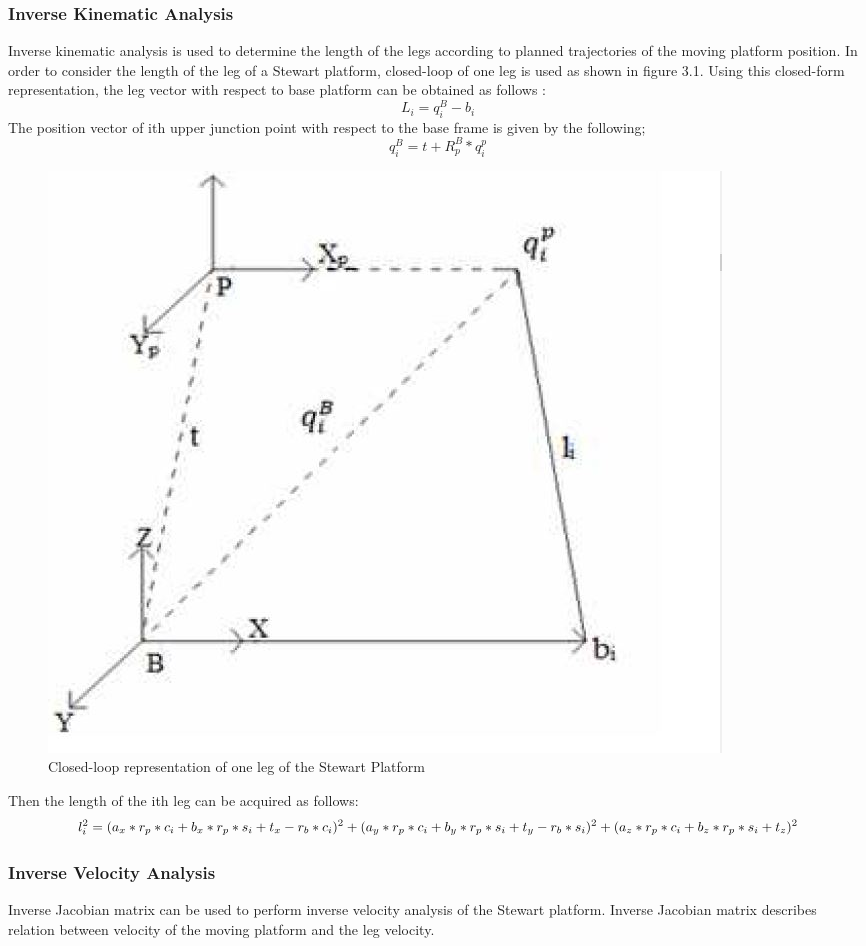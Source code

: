 \subsubsection{Inverse Kinematic Analysis}
Inverse kinematic analysis is used to determine the length of the legs according to planned trajectories of the moving platform position. In order to consider the length of the leg of a Stewart platform, closed-loop of one leg is used as shown in figure 3.1. Using this closed-form representation, the leg
vector with respect to base platform can be obtained as follows \cite{csumnu2017simulation}:
\begin{equation}
\label{eqn}
L_{i} = q_{i}^{B} - b_{i}
\end{equation}
The position vector of ith upper junction point with respect to the base frame is given by the following;
\begin{equation}
\label{eqn}
q_{i}^{B} = t + R_{p}^{B} * q_{i}^{p}
\end{equation}
\begin{center}
	\begin{figure}[!h]
	\centering
	\includegraphics[width=0.6\linewidth]{Figures/Fig12}
	\caption[Closed-loop representation]{Closed-loop representation of one leg of the Stewart Platform \cite{csumnu2017simulation}}
	\end{figure}
\end{center}
Then the length of the ith leg can be acquired as follows:
\begin{equation}
\label{eqn}
l_{i}^2 = (a_{x} * r_{p} * c_{i} + b_{x}*r_{p}*s_{i} + t_{x}-r_{b}*c_{i})^2 \\+ (a_{y}*r_{p}*c_{i} + b_{y}*r_{p}*s_{i} + t_{y}-r_{b}*s_{i})^2 \\+ (a_{z}*r_{p}*c_{i}+b_{z}*r_{p}*s_{i}+t_{z})^2
\end{equation}
\subsubsection{Inverse Velocity Analysis}
Inverse Jacobian matrix can be used to perform inverse velocity analysis of the Stewart
platform. Inverse Jacobian matrix describes relation between velocity of the moving platform and the leg velocity.

